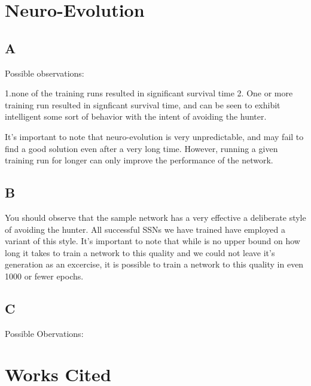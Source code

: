 \documentclass[12]{extarticle}
\begin{document}
\section{Neuro-Evolution}
\subsection{A}
Possible observations: 

1.none of the training runs resulted in significant survival time
2. One or more training run resulted in signficant survival time, and can be seen to exhibit intelligent some sort of behavior with the intent of avoiding the hunter. 

It's important to note that neuro-evolution is very unpredictable, and may fail to find a good solution even after a very long time. However, running a given training run for longer can only improve the performance of the network.


\subsection{B}
 You should observe that the sample network has a very effective a deliberate style of avoiding the hunter. All successful SSNs we have trained have employed a variant of this style. It's important to note that while is no upper bound on how long it takes to train a network to this quality and we could not leave it's generation as an excercise, it is possible to train a network to this quality in even 1000 or fewer epochs. 


\subsection{C}

Possible Obervations:



\section{Works Cited}
\end{document}
